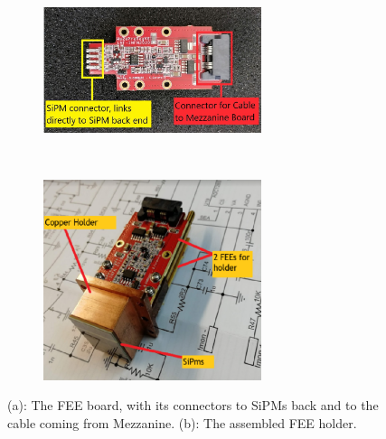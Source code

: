 \begin{figure}[!h]
    \centering
    \begin{subfigure}[t]{0.5\textwidth}
        \centering
        \includegraphics[width=0.7\textwidth]{figures/png/Screenshot_20240706_143204.png}
        \caption{}
        \label{fig:connectiontomezzanine}
    \end{subfigure}%
    ~ 
    \begin{subfigure}[t]{0.5\textwidth}
        \centering
        \includegraphics[width=0.7\textwidth]{figures/png/Screenshot_20240706_143517.png}
        \caption{}
        \label{fig:holder}
    \end{subfigure}
   \caption[The calorimeter FEE board.]{(a): The FEE board, with its connectors to SiPMs 
   back and to the cable coming from Mezzanine. 
   (b): The assembled FEE holder.}
    \label{fig:calooo}
  \end{figure}



